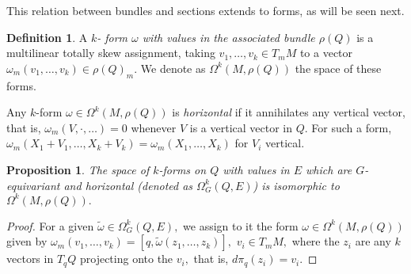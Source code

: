 \documentclass[12pt, letterpaper, reqno]{amsart}
\theoremstyle{definition}
\newtheorem{df}{Definition}
\theoremstyle{plain}
\newtheorem{prop}{Proposition}
\theoremstyle{remark}
\begin{document}
This relation between bundles and sections extends to forms, as will be seen next.

\begin{df}
	A \textit{$ k $- form $ \omega $ with values in the associated bundle $ \rho(Q) $} is a multilinear totally skew assignment, taking $ v_1,\dots, v_k\in T_mM $ to a vector $ \omega_m(v_1,\dots,v_k)\in \rho(Q)_m. $  We denote as $ \Omega^k(M, \rho(Q)) $ the space of these forms.
\end{df}

Any $ k $-form $ \omega\in \Omega^k(M,\rho(Q)) $ is \textit{horizontal} if it annihilates any vertical vector, that is, $ \omega_m(V,\cdot,\dots)=0 $ whenever $ V $ is a vertical vector in $ Q. $ For such a form, $ \omega_m(X_1+V_1,\dots,X_k+V_k)=\omega_m(X_1,\dots, X_k) $ for $ V_i $ vertical.

\begin{prop}
	The space of $ k $-forms on $ Q $ with values in $ E $ which are $ G $-equivariant and horizontal (denoted as $ \Omega^k_G(Q,E) $) is isomorphic to $ \Omega^k(M,\rho(Q)). $ 
\end{prop}
\begin{proof}
	For a given $ \tilde \omega\in\Omega^k_G(Q,E), $ we assign to it the form $ \omega\in\Omega^k(M, \rho(Q)) $ given by $ \omega_m(v_1,\dots,v_k) = [q,\tilde\omega(z_1,\dots,z_k)],  $  $v_i\in T_mM, $ where the $ z_i $ are any $ k $ vectors in $ T_qQ $ projecting onto the $ v_i, $ that is, $ d\pi_q(z_i)=v_i. $  
\end{proof}

\nocite{*}

\end{document}
